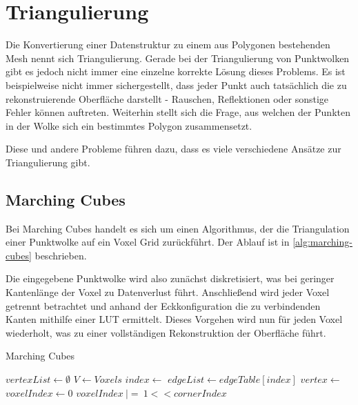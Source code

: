 \section{Triangulierung}
\label{sec:triangulation}

Die Konvertierung einer Datenstruktur zu einem aus Polygonen bestehenden Mesh nennt sich Triangulierung.
Gerade bei der Triangulierung von Punktwolken gibt es jedoch nicht immer eine einzelne korrekte Lösung dieses Problems.
Es ist beispielweise nicht immer sichergestellt, dass jeder Punkt auch tatsächlich die zu rekonstruierende Oberfläche darstellt - Rauschen, Reflektionen oder sonstige Fehler können auftreten.
Weiterhin stellt sich die Frage, aus welchen der Punkten in der Wolke sich ein bestimmtes Polygon zusammensetzt.

Diese und andere Probleme führen dazu, dass es viele verschiedene Ansätze zur Triangulierung gibt.


\subsection{Marching Cubes}
\label{subsec:marching-cubes}

Bei Marching Cubes \cite{lorensen1987marching} handelt es sich um einen Algorithmus, der die Triangulation einer Punktwolke auf ein Voxel Grid zurückführt.
Der Ablauf ist in \autoref{alg:marching-cubes} beschrieben.

Die eingegebene Punktwolke wird also zunächst diskretisiert, was bei geringer Kantenlänge der Voxel zu Datenverlust führt.
Anschließend wird jeder Voxel getrennt betrachtet und anhand der Eckkonfiguration die zu verbindenden Kanten mithilfe einer \ac{LUT} ermittelt.
Dieses Vorgehen wird nun für jeden Voxel wiederholt, was zu einer vollständigen Rekonstruktion der Oberfläche führt.

\begin{algorithm}[ht]
\caption[Marching Cubes]{Marching Cubes \cite[Abs. 4]{lorensen1987marching}}
\label{alg:marching-cubes}
\begin{algorithmic}
	\State $vertexList \gets \emptyset$
	\State $V \gets Voxels$
		\State $index \gets$ 
		\State $edgeList \gets edgeTable[index]$
			\State $vertex \gets$ 
			\State {}
		\EndFor
	\EndFor
\EndFunction
{}
	\State $voxelIndex \gets 0$
			\State $voxelIndex\ |=\ 1 << cornerIndex$
		\EndIf
	\EndFor
	\State {}
\EndFunction
\end{algorithmic}
\end{algorithm}

